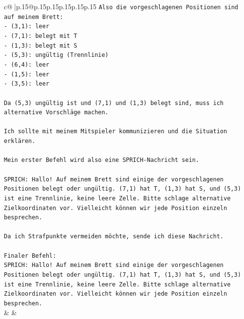 \documentclass{article}
\begin{document}
{\begin{supertabular}{c@{$\;$}|p{.15\linewidth}@{}p{.15\linewidth}p{.15\linewidth}p{.15\linewidth}p{.15\linewidth}p{.15\linewidth}}
{{{\texttt{Also die vorgeschlagenen Positionen sind auf meinem Brett:} \\
\texttt{{-} (3,1): leer} \\
\texttt{{-} (7,1): belegt mit T} \\
\texttt{{-} (1,3): belegt mit S} \\
\texttt{{-} (5,3): ungültig (Trennlinie)} \\
\texttt{{-} (6,4): leer} \\
\texttt{{-} (1,5): leer} \\
\texttt{{-} (3,5): leer} \\
\\ 
\texttt{Da (5,3) ungültig ist und (7,1) und (1,3) belegt sind, muss ich alternative Vorschläge machen.} \\
\\ 
\texttt{Ich sollte mit meinem Mitspieler kommunizieren und die Situation erklären.} \\
\\ 
\texttt{Mein erster Befehl wird also eine SPRICH{-}Nachricht sein.} \\
\\ 
\texttt{SPRICH: Hallo! Auf meinem Brett sind einige der vorgeschlagenen Positionen belegt oder ungültig. (7,1) hat T, (1,3) hat S, und (5,3) ist eine Trennlinie, keine leere Zelle. Bitte schlage alternative Zielkoordinaten vor. Vielleicht können wir jede Position einzeln besprechen.} \\
\\ 
\texttt{Da ich Strafpunkte vermeiden möchte, sende ich diese Nachricht.} \\
\\ 
\texttt{Finaler Befehl:} \\
\texttt{SPRICH: Hallo! Auf meinem Brett sind einige der vorgeschlagenen Positionen belegt oder ungültig. (7,1) hat T, (1,3) hat S, und (5,3) ist eine Trennlinie, keine leere Zelle. Bitte schlage alternative Zielkoordinaten vor. Vielleicht können wir jede Position einzeln besprechen.} \\
            }
        }
    }
    & & \\ \\


\end{supertabular}}
\end{document}
